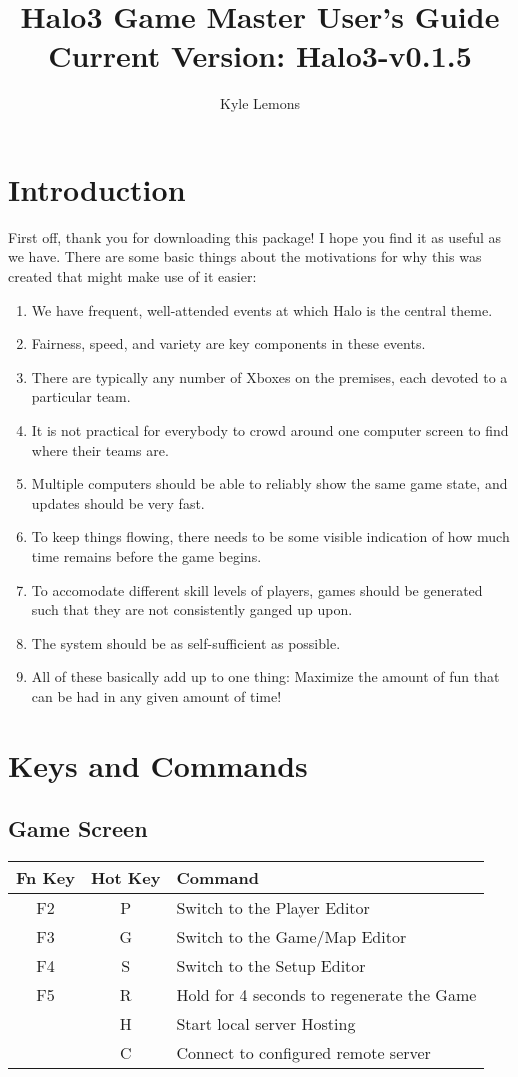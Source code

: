 \documentclass[10pt,a4paper]{report}
\author{Kyle Lemons}
\title{Halo3 Game Master User's Guide \\
{\large{Current Version: Halo3-v0.1.5}}}
\begin{document}
\maketitle
\tableofcontents
\pagebreak

\chapter{Introduction}
First off, thank you for downloading this package!  I hope you find it as useful as we have.
There are some basic things about the motivations for why this was created that might make use of it easier:
\begin{enumerate}
\item We have frequent, well-attended events at which Halo is the central theme.
\item Fairness, speed, and variety are key components in these events.
\item There are typically any number of Xboxes on the premises, each devoted to a particular team.
\item It is not practical for everybody to crowd around one computer screen to find where their teams are.
\item Multiple computers should be able to reliably show the same game state, and updates should be very fast.
\item To keep things flowing, there needs to be some visible indication of how much time remains before the game begins.
\item To accomodate different skill levels of players, games should be generated such that they are not consistently ganged up upon.
\item The system should be as self-sufficient as possible.
\item All of these basically add up to one thing: Maximize the amount of fun that can be had in any given amount of time!
\end{enumerate}

\chapter{Keys and Commands}
\section{Game Screen}
\begin{tabular}{c|c|l}
Fn Key & Hot Key & Command \\
\hline
F2 & P & Switch to the Player Editor \\
F3 & G & Switch to the Game/Map Editor \\
F4 & S & Switch to the Setup Editor \\
F5 & R & Hold for 4 seconds to regenerate the Game \\
& H & Start local server Hosting \\
& C & Connect to configured remote server \\
\end{tabular}
\end{document}
